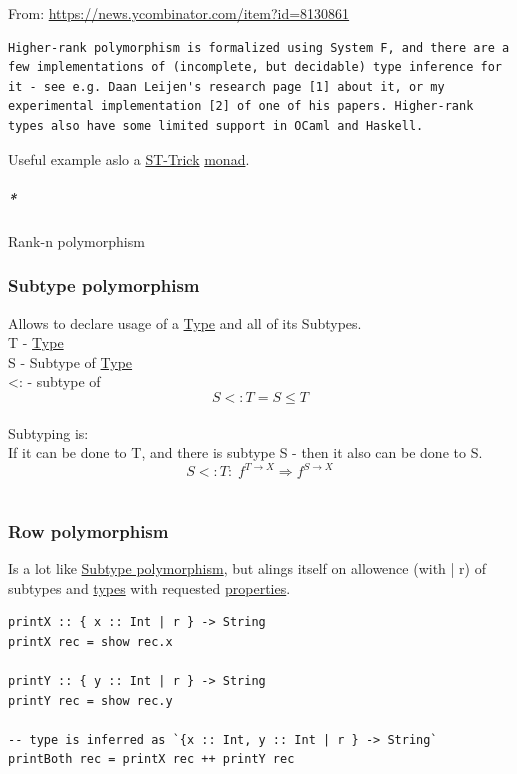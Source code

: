 \documentclass[11pt]{article}
\begin{document}
From: \url{https://news.ycombinator.com/item?id=8130861}\\
\begin{verbatim}
Higher-rank polymorphism is formalized using System F, and there are a few implementations of (incomplete, but decidable) type inference for it - see e.g. Daan Leijen's research page [1] about it, or my experimental implementation [2] of one of his papers. Higher-rank types also have some limited support in OCaml and Haskell.
\end{verbatim}

Useful example aslo a \hyperref[org17bfb25]{ST-Trick} \hyperref[org268aaf1]{monad}.\\

\subparagraph{\emph{*}}
\label{sec:orgcd1737e}

\label{org96200a4}Rank-n polymorphism\\

\subsubsection{\label{org6460f91}Subtype polymorphism}
\label{sec:org34e030f}
Allows to declare usage of a \hyperref[org4fbaeb8]{Type} and all of its Subtypes.\\
T - \hyperref[org4fbaeb8]{Type}\\
S - Subtype of \hyperref[org4fbaeb8]{Type}\\
<: - subtype of\\
$$ S <: T = S \le T $$\\

Subtyping is:\\
If it can be done to T, and there is subtype S - then it also can be done to S.\\
$$ S <:T : \; f^{T \to X} \Rightarrow f^{S \to X} $$\\

\subsubsection{\label{org5fb496b}Row polymorphism}
\label{sec:orgf67f47d}
Is a lot like \hyperref[org6460f91]{Subtype polymorphism}, but alings itself on allowence (with | r) of subtypes and \hyperref[org3927fd9]{types} with requested \hyperref[org763ad6b]{properties}.\\
\begin{verbatim}
printX :: { x :: Int | r } -> String
printX rec = show rec.x

printY :: { y :: Int | r } -> String
printY rec = show rec.y

-- type is inferred as `{x :: Int, y :: Int | r } -> String`
printBoth rec = printX rec ++ printY rec
\end{verbatim}
\end{document}
